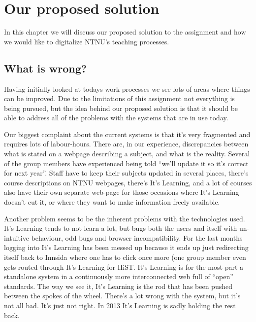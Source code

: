 \section{Our proposed solution}

In this chapter we will discuss our proposed solution to the assignment and how we would like to digitalize NTNU's teaching processes. 

\subsection{What is wrong?}
Having initially looked at todays work processes we see lots of areas where things can be improved. Due to the limitations of this assignment not everything
is being pursued, but the idea behind our proposed solution is that it should be able to address all of the problems with the systems that are in use today. 

\noindent
Our biggest complaint about the current systems is that it's very fragmented and requires lots of labour-hours. There are, in our experience, discrepancies between what is 
stated on a webpage describing a subject, and what is the reality. Several of the group members have experienced being told ``we'll update it so it's correct for next year''. 
Staff have to keep their subjects updated in several places, there's course descriptions on NTNU webpages, there's It's Learning, and a lot of courses also have their own separate
web-page for those occasions where It's Learning doesn't cut it, or where they want to make information freely available. 

\noindent
Another problem seems to be the inherent problems with the technologies used. It's Learning tends to not learn a lot, but bugs both the users and itself with un-intuitive behaviour, 
odd bugs and browser incompatibility. For the last months logging into It's Learning has been messed up because it ends up just redirecting itself back to Innsida where one has to 
click once more (one group member even gets routed through It's Learning for HiST. It's Learning is for the most part a standalone system in a continuously more interconnected web full of ``open'' standards. The way we see it, It's Learning is the 
rod that has been pushed between the spokes of the wheel. There's a lot wrong with the system, but it's not all bad. It's just not right. In 2013 It's Learning is sadly holding the 
rest back. 

